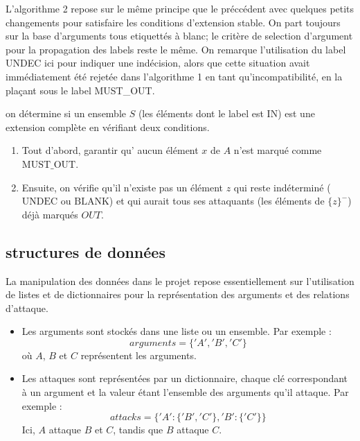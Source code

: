 \documentclass{rapportECL}
\begin{document}
\begin{itemize}
 L'algorithme 2 repose sur le même principe que le préccédent avec quelques petits changements pour satisfaire les conditions d'extension stable.
 On part toujours sur la base d'arguments tous etiquettés à blanc;  le critère de selection d'argument pour la propagation des labels reste le même.
 On remarque l'utilisation du label UNDEC ici pour indiquer une indécision, alors que cette situation avait immédiatement été 
 rejetée dans l'algorithme 1 en tant qu'incompatibilité, en la plaçant sous le label MUST\_OUT.

 
 on détermine si un ensemble \( S \) (les éléments dont le label est \( \text{IN} \)) est une extension complète en vérifiant 
 deux conditions. 

 	\begin{enumerate}
		\item Tout d'abord, garantir qu' aucun élément \( x \) de \( A \) n'est marqué 
		comme \( \text{MUST\_OUT} \).
		\item Ensuite, on vérifie qu'il n'existe pas un élément \( z \) 
		qui reste indéterminé (\( \text{UNDEC} \) ou \( \text{BLANK} \)) et qui aurait tous ses attaquants (les éléments de \( \{z\}^- \)) déjà marqués  \( {OUT} \).
	\end{enumerate}

\end{itemize}

\newpage

\subsection{structures de données}

La manipulation des données dans le projet repose essentiellement sur l’utilisation de listes et de dictionnaires pour la représentation des arguments et des relations d’attaque.

\begin{itemize}
    \item Les arguments sont stockés dans une liste ou un ensemble. Par exemple : 
    \[
    {arguments = \{'A', 'B', 'C'\}}
    \]
    où \( A \), \( B \) et \( C \) représentent les arguments.

    \item Les attaques sont représentées par un dictionnaire, chaque clé correspondant à un argument et la valeur étant l’ensemble des arguments qu’il attaque. Par exemple :
    \[
    {attacks = \{'A': \{'B', 'C'\}, 'B': \{'C'\}\}}
    \]
    Ici, \( A \) attaque \( B \) et \( C \), tandis que \( B \) attaque \( C \).
\end{itemize}
\end{document}
